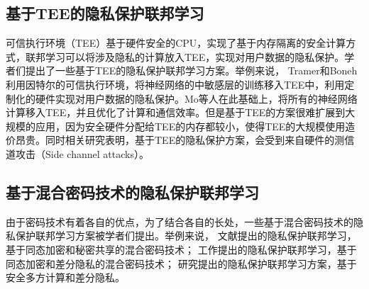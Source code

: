 \subsection{基于TEE的隐私保护联邦学习}
可信执行环境（TEE）基于硬件安全的CPU，实现了基于内存隔离的安全计算方式，联邦学习可以将涉及隐私的计算放入TEE，实现对用户数据的隐私保护。学者们提出了一些基于TEE的隐私保护联邦学习方案\cite{tramer2018slalom, mo2019efficient, mo2021ppfl, mo2020darknetz}。举例来说，
Tramer和Boneh\cite{tramer2018slalom}利用因特尔的可信执行环境，将神经网络的中敏感层的训练移入TEE中，利用定制化的硬件实现对用户数据的隐私保护。Mo等人\cite{mo2021ppfl}在此基础上，将所有的神经网络计算移入TEE，并且优化了计算和通信效率。但是基于TEE的方案很难扩展到大规模的应用，因为安全硬件分配给TEE的内存都较小，使得TEE的大规模使用造价昂贵。同时相关研究\cite{van2018foreshadow}表明，基于TEE的隐私保护方案，会受到来自硬件的测信道攻击（Side channel attacks）。

\subsection{基于混合密码技术的隐私保护联邦学习}
由于密码技术有着各自的优点，为了结合各自的长处，一些基于混合密码技术的隐私保护联邦学习方案\cite{choquette2021capc, hao2019efficient, hao2019towards, mugunthan2019smpai, truex2019hybrid, xu2019verifynet, xu2019hybridalpha, zhang2020privacy, zhao2020smss}被学者们提出。举例来说，
文献\cite{xu2019verifynet, zhao2020smss}提出的隐私保护联邦学习，基于同态加密和秘密共享的混合密码技术；
工作\cite{hao2019efficient, hao2019towards}提出的隐私保护联邦学习，基于同态加密和差分隐私的混合密码技术；
研究\cite{mugunthan2019smpai, truex2019hybrid, xu2019hybridalpha}提出的隐私保护联邦学习方案，基于安全多方计算和差分隐私。

